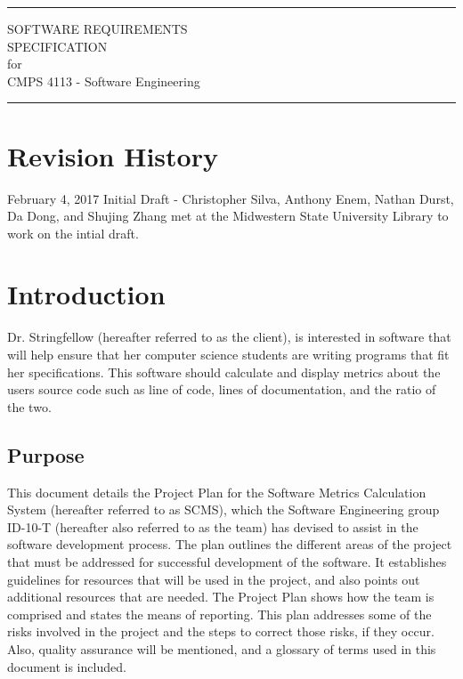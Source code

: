 \documentclass{scrreprt}
\author{Christopher Silva}
\date{}
\def\myversion{0.1 }
\begin{document}
	\begin{titlepage}
		\flushright
		\rule{16cm}{5pt}\vskip1cm
		\Huge{SOFTWARE REQUIREMENTS\\ SPECIFICATION}\\
		\vspace{2cm}
		for\\
		\vspace{2cm}
		CMPS 4113 - Software Engineering\\
		\vspace{2cm}
		\vfill
		\rule{16cm}{5pt}
	\end{titlepage}
	\tableofcontents
	\chapter*{Revision History}
	February 4, 2017 Initial Draft - Christopher Silva, Anthony Enem, Nathan Durst, Da Dong, and Shujing Zhang met at the Midwestern State University Library to work on the intial draft.
	\chapter{Introduction}
	Dr. Stringfellow (hereafter referred to as the client), is interested in software that will help ensure that her computer science students are writing programs that fit her specifications. This software should calculate and display metrics about the users source code such as line of code, lines of documentation, and the ratio of the two.
	\section{Purpose}
	This document details the Project Plan for the Software Metrics Calculation System (hereafter referred to as SCMS), which the Software Engineering group ID-10-T (hereafter also referred to as the team) has devised to assist in the software development process. The plan outlines the different areas of the project that must be addressed for successful development of the software. It establishes guidelines for resources that will be used in the project, and also points out additional resources that are needed. The Project Plan shows how the team is comprised and states the means of reporting. This plan addresses some of the risks involved in the project and the steps to correct those risks, if they occur. Also, quality assurance will be mentioned, and a glossary of terms used in this document is included.
\end{document}
